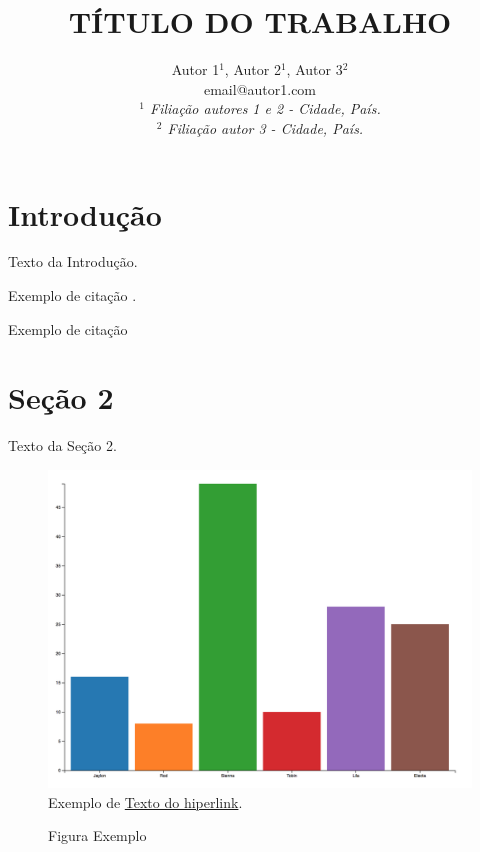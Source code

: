 \documentclass[12pt]{article}
\begin{document}
\onehalfspacing

\title{\Large\bf TÍTULO DO TRABALHO}
\author{%
	Autor 1${}^1$, \qquad Autor 2${}^1$, \qquad Autor 3${}^2$ \\[1.1ex]
    {\small email@autor1.com}\\
	\emph{\small ${}^1$ Filiação autores 1 e 2 - Cidade, País.} \\
        \emph{\small ${}^2$ Filiação autor 3 - Cidade, País.}
}
\date{}
\maketitle
\thispagestyle{fancy}

\section{Introdução}
Texto da Introdução.

Exemplo de citação \citep{bolfarine2005elementos}.

Exemplo de citação \cite{bolfarine2005elementos}

\section{Seção 2}
Texto da Seção 2.

\begin{figure}[htbp]
	\centering
        \caption{Figura Exemplo}
		\includegraphics[scale=0.15]{exemplo_figura.png}
        \label{rotulo_figura}\\
  \normalsize{Exemplo de \href{https://imgur.com/gallery/j8K7nfa}{Texto do hiperlink}.}
\end{figure}
\end{document}
